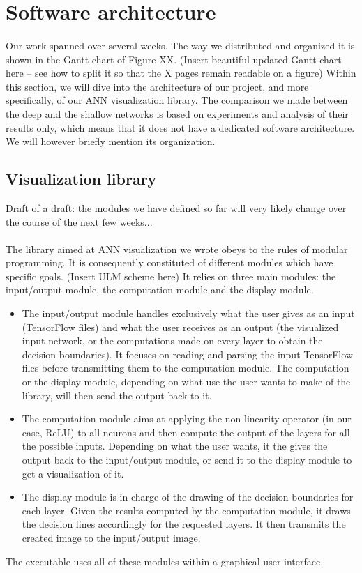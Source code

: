 \documentclass[a4paper]{article}
\begin{document}
\section{Software architecture}
\paragraph{}Our work spanned over several weeks. The way we distributed and organized it is shown in the Gantt chart of Figure XX. (Insert beautiful updated Gantt chart here -- see how to split it so that the X pages remain readable on a figure) Within this section, we will dive into the architecture of our project, and more specifically, of our ANN visualization library. The comparison we made between the deep and the shallow networks is based on experiments and analysis of their results only, which means that it does not have a dedicated software architecture. We will however briefly mention its organization.

\subsection{Visualization library}
Draft of a draft: the modules we have defined so far will very likely change over the course of the next few weeks...
\paragraph{}The library aimed at ANN visualization we wrote obeys to the rules of modular programming. It is consequently constituted of different modules which have specific goals. (Insert ULM scheme here) It relies on three main modules: the input/output module, the computation module and the display module.
\begin{itemize}
\item The input/output module handles exclusively what the user gives as an input (TensorFlow files) and what the user receives as an output (the visualized input network, or the computations made on every layer to obtain the decision boundaries). It focuses on reading and parsing the input TensorFlow files before transmitting them to the computation module. The computation or the display module, depending on what use the user wants to make of the library, will then send the output back to it.
\item The computation module aims at applying the non-linearity operator (in our case, ReLU) to all neurons and then compute the output of the layers for all the possible inputs. Depending on what the user wants, it the gives the output back to the input/output module, or send it to the display module to get a visualization of it.
\item The display module is in charge of the drawing of the decision boundaries for each layer. Given the results computed by the computation module, it draws the decision lines accordingly for the requested layers. It then transmits the created image to the input/output image. 
\end{itemize}
The executable uses all of these modules within a graphical user interface.
\end{document}
